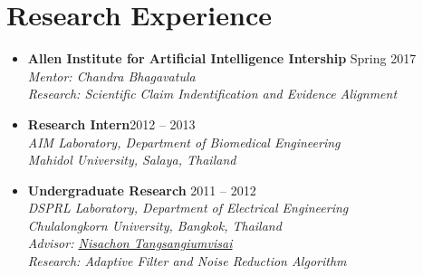 \section{\sc Research Experience}

\begin{itemize}[leftmargin=0cm, label={}]

\item {\bf Allen Institute for Artificial Intelligence Intership} \hfill{Spring 2017}\\
{\em Mentor: Chandra Bhagavatula}\\
{\em Research: Scientific Claim Indentification and Evidence Alignment}

\item {\bf Research Intern}\hfill{2012 -- 2013}\\
{\em AIM Laboratory, Department of Biomedical Engineering\\
Mahidol University, Salaya, Thailand}

\item {\bf Undergraduate Research}		\hfill{2011 -- 2012}\\
{\em DSPRL Laboratory, Department of Electrical Engineering\\
Chulalongkorn University, Bangkok, Thailand\\
Advisor: \href{http://nisachon.lecturer.eng.chula.ac.th}{Nisachon Tangsangiumvisai}\\
Research: Adaptive Filter and Noise Reduction Algorithm}

\end{itemize}